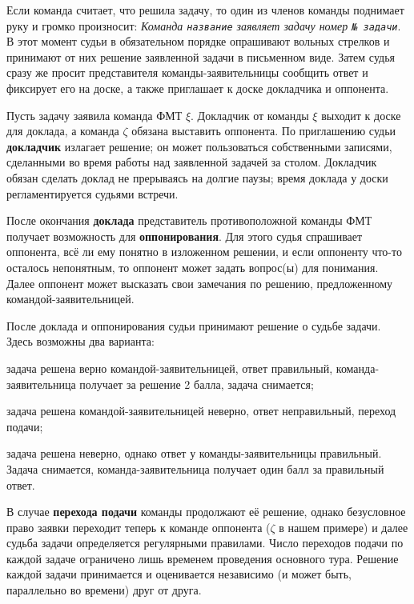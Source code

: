 \documentclass[12pt,a4paper]{article}
\begin{document}
Если команда считает, что решила задачу, то один из членов команды поднимает руку и громко произносит: \textsl{Команда \texttt{название} заявляет задачу номер \texttt{№ задачи}}. В этот момент судьи в обязательном порядке опрашивают вольных стрелков и принимают от них решение заявленной задачи в письменном виде. Затем судья сразу же просит представителя команды-заявительницы сообщить ответ и фиксирует его на доске, а также приглашает к доске докладчика и оппонента.

Пусть задачу заявила команда ФМТ $\xi$. Докладчик от команды $\xi$ выходит к доске для доклада, а команда $\zeta$ обязана выставить оппонента. По приглашению судьи \textbf{докладчик} излагает решение; он может пользоваться собственными записями, сделанными во время работы над заявленной задачей за столом. Докладчик обязан сделать доклад не прерываясь на долгие паузы; время доклада у доски регламентируется судьями встречи.

После окончания \textbf{доклада} представитель противоположной команды ФМТ получает возможность для \textbf{оппонирования}. Для этого судья спрашивает оппонента, всё ли ему понятно в изложенном решении, и если оппоненту что-то осталось непонятным, то оппонент может задать вопрос(ы) для понимания. Далее оппонент может высказать свои замечания по решению, предложенному командой-заявительницей.

После доклада и оппонирования судьи принимают решение о судьбе задачи. Здесь возможны два варианта:
\begin{list}{--}{\leftmargin=10mm  \topsep=0mm  \itemsep=1pt \parsep=0mm \itemindent=-1.5pt}
\item задача решена верно командой-заявительницей, ответ правильный, команда-заявительница получает за решение 2 балла, задача снимается;
\item задача решена командой-заявительницей неверно, ответ неправильный, переход подачи;
\item задача решена неверно, однако ответ у команды-заявительницы правильный. Задача снимается, команда-заявительница получает один балл за правильный ответ.
\end{list}

В случае \textbf{перехода подачи} команды продолжают её решение, однако безусловное право заявки переходит теперь к команде оппонента ($\zeta$ в нашем примере) и далее судьба задачи определяется регулярными правилами. Число переходов подачи по каждой задаче ограничено лишь временем проведения основного тура. Решение каждой задачи принимается и оценивается независимо (и может быть, параллельно во времени) друг от друга.
\end{document}
